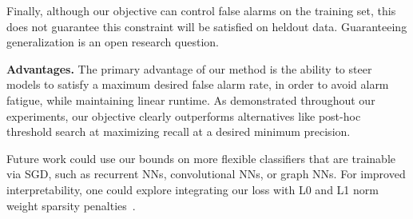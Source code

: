 Finally, although our objective can control false alarms on the training set, this does not guarantee this constraint will be satisfied on heldout data.
Guaranteeing generalization is an open research question. 


\textbf{Advantages.}
The primary advantage of our method is the ability to steer models to satisfy a maximum desired false alarm rate, in order to avoid alarm fatigue, while maintaining linear runtime.
As demonstrated throughout our experiments, our objective clearly outperforms alternatives like post-hoc threshold search at maximizing recall at a desired minimum precision.

Future work could use our bounds on more flexible classifiers that are trainable via SGD, such as recurrent NNs, convolutional NNs, or graph NNs.
For improved interpretability, one could explore integrating our loss with L0 and L1 norm weight sparsity penalties~\citep{tibshirani1996regression, ustunSupersparseLinearInteger2016}.
